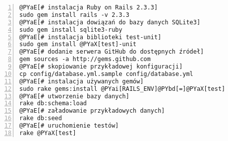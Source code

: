 \begin{Verbatim}[commandchars=@\[\],numbers=left,firstnumber=1,stepnumber=1]
@PYaE[# instalacja Ruby on Rails 2.3.3]
sudo gem install rails -v 2.3.3
@PYaE[# instalacja dowiązań do bazy danych SQLite3]
sudo gem install sqlite3-ruby
@PYaE[# instalacja biblioteki test-unit]
sudo gem install @PYaX[test]-unit
@PYaE[# dodanie serwera GitHub do dostępnych źródeł]
gem sources -a http://gems.github.com
@PYaE[# skopiowanie przykładowej konfiguracji]
cp config/database.yml.sample config/database.yml
@PYaE[# instalacja używanych gemów]
sudo rake gems:install @PYai[RAILS_ENV]@PYbd[=]@PYaX[test]
@PYaE[# utworzenie bazy danych]
rake db:schema:load
@PYaE[# załadowanie przykładowych danych]
rake db:seed
@PYaE[# uruchomienie testów]
rake @PYaX[test]
\end{Verbatim}
